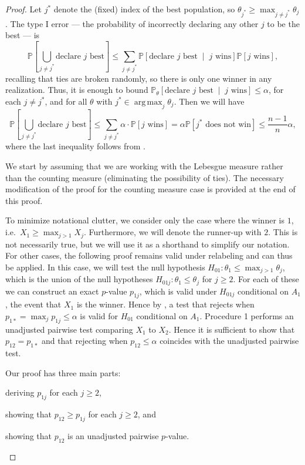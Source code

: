 \documentclass[11pt]{article}
\DeclareMathOperator*{\argmax}{arg\,max}
\theoremstyle{definition}
\theoremstyle{custom}
\newcommand{\PP}{\mathbb{P}}
\begin{document}
\begin{proof}
Let $j^*$ denote the (fixed) index of the best population, so $\theta_{j^*} \ge \max_{j\neq j^*} \theta_j$. The type I error --- the probability of incorrectly declaring any other $j$ to be the best --- is
$$\PP\left[\bigcup_{j \ne j^*} \text{declare } j \text{ best}\right] \le \sum_{j \ne j^*} \PP\left[\text{declare } j \text{ best} \;\middle|\; j \text{ wins}\right] \PP\left[j \text{ wins}\right],$$
recalling that ties are broken randomly, so there is only one winner in any realization. Thus, it is enough to bound $\PP_{\theta}\left[ \text{declare } j \text{ best} \;\middle|\; j \text{ wins}\right] \le \alpha$, for each $j \ne j^*$, and for all $\theta$ with $j^* \in \argmax_j \theta_j$. Then we will have
\begin{equation}
\PP\left[\bigcup_{j \ne j^*} \text{declare } j \text{ best}\right] \le \sum_{j \ne j^*} \alpha \cdot \PP\left[j \text{ wins}\right] = \alpha \PP\left[j^* \text{ does not win}\right] \le \frac{n-1}{n} \alpha,
\label{eq:marginal}
\end{equation}
where the last inequality follows from .

We start by assuming that we are working with the Lebesgue measure rather than the counting measure (eliminating the possibility of ties). The necessary modification of the proof for the counting measure case is provided at the end of this proof.

To minimize notational clutter, we consider only the case where the winner is $1$, i.e.\ $X_1 \ge \max_{j > 1} X_j$. Furthermore, we will denote the runner-up with $2$. This is not necessarily true, but we will use it as a shorthand to simplify our notation. For other cases, the following proof remains valid under relabeling and can thus be applied. In this case, we will test the null hypothesis $H_{01}: \theta_1 \le \max_{j > 1} \theta_j$, which is the union of the null hypotheses $H_{01j}: \theta_1 \le \theta_j$ for $j \ge 2$. For each of these we can construct an exact $p$-value $p_{1j}$, which is valid under $H_{01j}$ conditional on $A_1$, the event that $X_1$ is the winner. Hence by , a test that rejects when $p_{1*} = \max_j p_{1j} \le \alpha$ is valid for $H_{01}$ conditional on $A_1$. Procedure 1 performs an unadjusted pairwise test comparing $X_1$ to $X_2$. Hence it is sufficient to show that $p_{12} = p_{1*}$ and that rejecting when $p_{12}\le \alpha$ coincides with the unadjusted pairwise test.

Our proof has three main parts:
\begin{inlinelist}
\item deriving $p_{1j}$ for each $j\ge 2$,
\item showing that $p_{12} \ge p_{1j}$ for each $j\ge 2$, and
\item showing that $p_{12}$ is an unadjusted pairwise $p$-value.
\end{inlinelist}


\end{proof}
\end{document}
